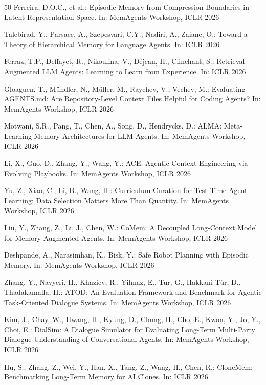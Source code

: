 \documentclass[hf]{ceurart}
\begin{document}
\begin{thebibliography}{50}
Ferreira, D.O.C., et al.: Episodic Memory from Compression Boundaries
in Latent Representation Space. In: MemAgents Workshop, ICLR 2026

Talebirad, Y., Parsaee, A., Szepesvari, C.Y., Nadiri, A., Zaiane, O.:
Toward a Theory of Hierarchical Memory for Language Agents. In:
ICLR 2026

Ferraz, T.P., Deffayet, R., Nikoulina, V., D\'{e}jean, H., Clinchant,
S.: Retrieval-Augmented LLM Agents: Learning to Learn from Experience.
In: ICLR 2026

Gloaguen, T., M\"{u}ndler, N., M\"{u}ller, M., Raychev, V., Vechev,
M.: Evaluating AGENTS.md: Are Repository-Level Context Files Helpful
for Coding Agents? In: MemAgents Workshop, ICLR 2026

Motwani, S.R., Pang, T., Chen, A., Song, D., Hendrycks, D.:
ALMA: Meta-Learning Memory Architectures for LLM Agents.
In: MemAgents Workshop, ICLR 2026

Li, X., Guo, D., Zhang, Y., Wang, Y.:
ACE: Agentic Context Engineering via Evolving Playbooks.
In: MemAgents Workshop, ICLR 2026

Yu, Z., Xiao, C., Li, B., Wang, H.:
Curriculum Curation for Test-Time Agent Learning: Data Selection
Matters More Than Quantity. In: MemAgents Workshop, ICLR 2026

Liu, Y., Zhang, Z., Li, J., Chen, W.:
CoMem: A Decoupled Long-Context Model for Memory-Augmented Agents.
In: MemAgents Workshop, ICLR 2026

Deshpande, A., Narasimhan, K., Bisk, Y.:
Safe Robot Planning with Episodic Memory.
In: MemAgents Workshop, ICLR 2026

Zhang, Y., Nayyeri, H., Khaziev, R., Yilmaz, E., Tur, G.,
Hakkani-T\"{u}r, D., Thadakamalla, H.:
ATOD: An Evaluation Framework and Benchmark for Agentic
Task-Oriented Dialogue Systems. In: MemAgents Workshop, ICLR 2026

Kim, J., Chay, W., Hwang, H., Kyung, D., Chung, H., Cho, E.,
Kwon, Y., Jo, Y., Choi, E.:
DialSim: A Dialogue Simulator for Evaluating Long-Term Multi-Party
Dialogue Understanding of Conversational Agents.
In: MemAgents Workshop, ICLR 2026

Hu, S., Zhang, Z., Wei, Y., Han, X., Tang, Z., Wang, H., Chen, R.:
CloneMem: Benchmarking Long-Term Memory for AI Clones.
In: ICLR 2026


\end{thebibliography}
\end{document}
